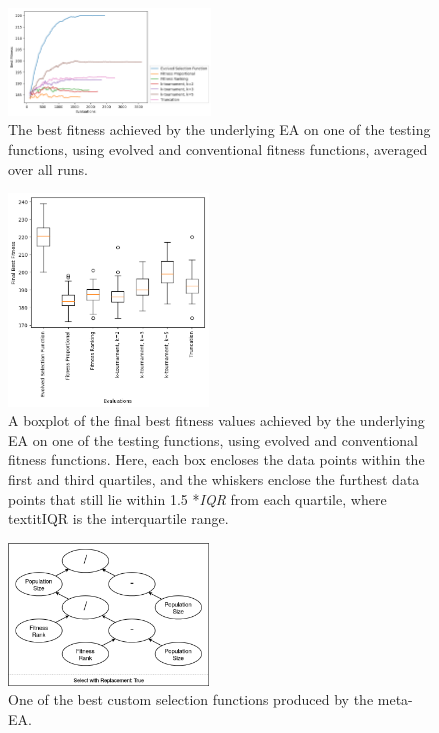 \documentclass[sigconf]{acmart}
\begin{document}
\begin{figure}
    \centering
    \includegraphics[width=0.478\textwidth]{nk_landscape_fitness_plot}
    \caption{The best fitness achieved by the underlying EA on one of the testing functions, using evolved and conventional fitness functions, averaged over all runs.}
    \label{fig:nk_landscape_fitness_plot}
\end{figure}

\begin{figure}
    \centering
    \includegraphics[width=0.475\textwidth]{nk_landscape_boxplot}
    \caption{A boxplot of the final best fitness values achieved by the underlying EA on one of the testing functions, using evolved and conventional fitness functions. Here, each box encloses the data points within the first and third quartiles, and the whiskers enclose the furthest data points that still lie within 1.5 *\textit{IQR} from each quartile, where textit{IQR} is the interquartile range.}
    \label{fig:nk_landscape_fitness_boxplot}
\end{figure}

\begin{figure}
    \centering
    \includegraphics[width=0.475\textwidth]{adpsea_final}
    \caption{One of the best custom selection functions produced by the meta-EA.}
    \label{fig:adpsea_final}
\end{figure}
\end{document}
